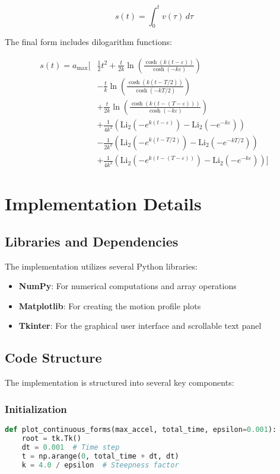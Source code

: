 \documentclass[12pt,a4paper]{article}
\begin{document}
\begin{equation}
s(t) = \int_0^t v(\tau)\,d\tau
\end{equation}

The final form includes dilogarithm functions:

\begin{equation}
\begin{split}
s(t) = a_{\text{max}}\Big[&\frac{1}{2}t^2 + \frac{t}{2k}\ln\left(\frac{\cosh(k(t-\varepsilon))}{\cosh(-k\varepsilon)}\right) \\
&- \frac{t}{k}\ln\left(\frac{\cosh(k(t-T/2))}{\cosh(-kT/2)}\right) \\
&+ \frac{t}{2k}\ln\left(\frac{\cosh(k(t-(T-\varepsilon)))}{\cosh(-k\varepsilon)}\right) \\
&+ \frac{1}{4k^2}(\text{Li}_2(-e^{k(t-\varepsilon)}) - \text{Li}_2(-e^{-k\varepsilon})) \\
&- \frac{1}{2k^2}(\text{Li}_2(-e^{k(t-T/2)}) - \text{Li}_2(-e^{-kT/2})) \\
&+ \frac{1}{4k^2}(\text{Li}_2(-e^{k(t-(T-\varepsilon))}) - \text{Li}_2(-e^{-k\varepsilon}))\Big]
\end{split}
\end{equation}

\section{Implementation Details}

\subsection{Libraries and Dependencies}
The implementation utilizes several Python libraries:
\begin{itemize}
\item \textbf{NumPy}: For numerical computations and array operations
\item \textbf{Matplotlib}: For creating the motion profile plots
\item \textbf{Tkinter}: For the graphical user interface and scrollable text panel
\end{itemize}

\subsection{Code Structure}
The implementation is structured into several key components:

\subsubsection{Initialization}
\begin{lstlisting}[language=Python]
def plot_continuous_forms(max_accel, total_time, epsilon=0.001):
    root = tk.Tk()
    dt = 0.001  # Time step
    t = np.arange(0, total_time + dt, dt)
    k = 4.0 / epsilon  # Steepness factor
\end{lstlisting}
\end{document}
